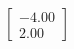\documentclass[preview]{standalone}
\begin{document}
\begin{align*}
\begin{bmatrix} -4.00 \\ 2.00 \end{bmatrix}
\end{align*}
\end{document}
